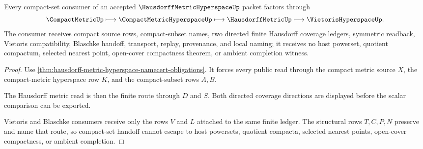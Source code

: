 \begin{theorem}
\label{thm:hausdorff-metric-hyperspace-compact-set-handoff}
Every compact-set consumer of an accepted $\HausdorffMetricHyperspaceUp$ packet factors through
$$
\CompactMetricUp \longmapsto \CompactMetricHyperspaceUp \longmapsto \HausdorffMetricUp \longmapsto \VietorisHyperspaceUp .
$$
The consumer receives compact source rows, compact-subset names, two directed finite Hausdorff coverage ledgers, symmetric readback, Vietoris compatibility, Blaschke handoff, transport, replay, provenance, and local naming; it receives no host powerset, quotient compactum, selected nearest point, open-cover compactness theorem, or ambient completion witness.
\end{theorem}
\begin{proof}
Use \autoref{thm:hausdorff-metric-hyperspace-namecert-obligations}. It forces every public read through the compact metric source $X$, the compact-metric hyperspace row $K$, and the compact-subset rows $A,B$.

The Hausdorff metric read is then the finite route through $D$ and $S$. Both directed coverage directions are displayed before the scalar comparison can be exported.

Vietoris and Blaschke consumers receive only the rows $V$ and $L$ attached to the same finite ledger. The structural rows $T,C,P,N$ preserve and name that route, so compact-set handoff cannot escape to host powersets, quotient compacta, selected nearest points, open-cover compactness, or ambient completion.
\end{proof}





